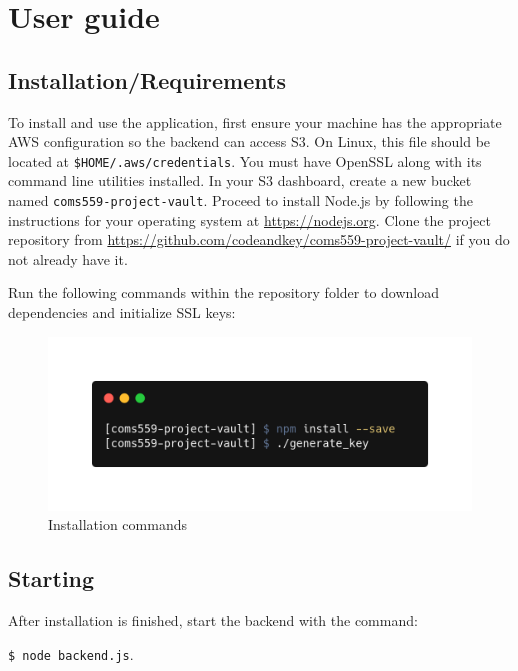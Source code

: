 \documentclass{article}
\begin{document}
\section{User guide}

\subsection{Installation/Requirements}
To install and use the application, first ensure your machine has the appropriate AWS configuration so the backend can access S3. On Linux, this file should be located at \texttt{\$HOME/.aws/credentials}. You must have OpenSSL along with its command line utilities installed. In your S3 dashboard, create a new bucket named \texttt{coms559-project-vault}. Proceed to install Node.js by following the instructions for your operating system at \url{https://nodejs.org}. Clone the project repository from \url{https://github.com/codeandkey/coms559-project-vault/} if you do not already have it.

Run the following commands within the repository folder to download dependencies and initialize SSL keys:

\begin{figure}
    \centering
    \includegraphics[scale=0.35]{carbon(3).png}
    \caption{Installation commands}
    \label{fig:commands}
\end{figure}

\subsection{Starting}
After installation is finished, start the backend with the command:

\texttt{\$ node backend.js}.
\end{document}
